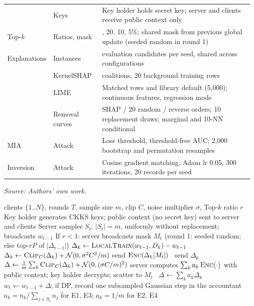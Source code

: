 \documentclass[11pt,a4paper]{article}
\begin{document}
\begin{table}[H]
\begin{tabularx}{\textwidth}{>{\raggedright\arraybackslash}p{2.6cm}>{\raggedright\arraybackslash}p{3.6cm}>{\raggedright\arraybackslash}X}
 & Keys & Key holder holds secret key; server and clients receive public context only \\
Top-$k$ & Ratios, mask & 50, 20, 10, 5\%; shared mask from previous global update (seeded random in round 1) \\
Explanations & Instances & 30 evaluation candidates per seed, shared across configurations \\
 & KernelSHAP & 200 coalitions, 20 background training rows \\
 & LIME & Matched rows and library default (5,000); continuous features, regression mode \\
 & Removal curves & SHAP / 20 random / reverse orders; 10 replacement draws; marginal and 10-NN conditional \\
MIA & Attack & Loss threshold, threshold-free AUC; 2,000 bootstrap and permutation resamples \\
Inversion & Attack & Cosine gradient matching, Adam lr 0.05, 300 iterations, 20 records per seed \\
\bottomrule
\end{tabularx}
\par\smallskip\raggedright\footnotesize\textit{Source: Authors' own work.}
\end{table}



\begin{algorithm}[H]
\caption{Training procedure for E1--E4 (one seed).}
\label{alg:fl}
\begin{algorithmic}[1]
\Require clients $\{1..N\}$, rounds $T$, sample size $m$, clip $C$, noise multiplier $\sigma$, Top-$k$ ratio $r$
\State Key holder generates CKKS keys; public context (no secret key) sent to server and clients 
  \State Server samples $S_t$, $|S_t|=m$, uniformly without replacement; broadcasts $w_{t-1}$
  \State If $r<1$: server broadcasts mask $M_t$ (round 1: seeded random; else top-$rP$ of $|\Delta_{t-1}|$) 
    \State $\Delta_k \gets \textsc{LocalTrain}(w_{t-1}, D_k) - w_{t-1}$
     $\Delta_k \gets \textsc{Clip}_C(\Delta_k) + \mathcal{N}(0,\sigma^2C^2/m)$ \EndIf
     send $\textsc{Enc}(\Delta_k[M_t])$ \Else\ send $\Delta_k$ \EndIf
  \EndFor
   $\Delta \gets \frac1m\sum_k \textsc{Clip}_C(\Delta_k) + \mathcal{N}(0,(\sigma C/m)^2)$ 
   server computes $\sum_k a_k\,\textsc{Enc}(\cdot)$ with public context; key holder decrypts; scatter to $M_t$
  \Else\ $\Delta \gets \sum_k a_k \Delta_k$ \EndIf
  \State $w_t \gets w_{t-1}+\Delta$; if DP, record one subsampled Gaussian step in the accountant
\EndFor
\State $a_k = n_k/\sum_{j\in S_t} n_j$ for E1, E3; $a_k = 1/m$ for E2, E4
\end{algorithmic}
\end{algorithm}
\end{document}
